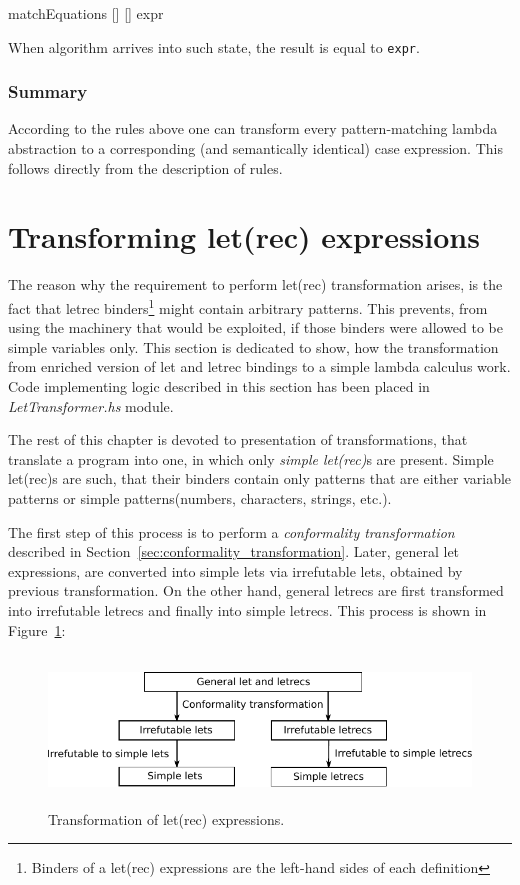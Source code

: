 \documentclass[12pt,a4paper]{report}
\begin{document}
\vspace*{0.2in}
\begin{code}[style=haskell]
matchEquations [] [] expr
\end{code}

When algorithm arrives into such state, the result is equal to \texttt{expr}.

\subsubsection{Summary}
According to the rules above one can transform every pattern-matching lambda
abstraction to a corresponding (and semantically identical) case expression.
This follows directly from the description of rules.

\section{Transforming let(rec) expressions}
\label{sec:letrec_transform}
The reason why the requirement to perform let(rec) transformation arises, is
the fact that letrec binders\footnote{Binders of a let(rec) expressions are the
left-hand sides of each definition} might contain arbitrary patterns. This
prevents, from using the machinery that would be exploited, if those binders were
allowed to be simple variables only. This section is dedicated to show, how the
transformation from enriched version of let and letrec bindings to a simple
lambda calculus work. Code implementing logic described in this section has
been placed in \textit{LetTransformer.hs} module.

The rest of this chapter is devoted to presentation of transformations, that
translate a program into one, in which only \textit{simple let(rec)}s are
present. Simple let(rec)s are such, that their binders contain only patterns
that are either variable patterns or simple patterns(numbers, characters,
strings, etc.).

The first step of this process is to perform a \textit{conformality
transformation} described in Section~\ref{sec:conformality_transformation}.
Later, general let expressions, are converted into simple lets via irrefutable
lets, obtained by previous transformation. On the other hand, general letrecs
are first transformed into irrefutable letrecs and finally into simple letrecs.
This process is shown in Figure~\ref{fig:letrec_transform}:

\begin{figure}[h!]
  \centering
  \includegraphics[height=4cm]{let_transform}
  \caption{Transformation of let(rec) expressions.}
  \label{fig:letrec_transform}
\end{figure}
\end{document}
